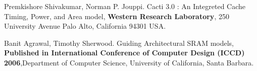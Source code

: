 
\begin{thebibliography}{99}

\bibitem{} Premkishore Shivakumar, Norman P. Jouppi. Cacti 3.0 : An Integreted Cache Timing, Power, and Area model,
{\bf Western Research Laboratory}, 250 University Avenue Palo Alto, California 94301 USA.


\bibitem{} Banit Agrawal, Timothy Sherwood. Guiding Architectural SRAM models, 
{\bf Published in International Conference of Computer Design (ICCD) 2006},Department of Computer Science, University of California, Santa Barbara.


\end{thebibliography}


